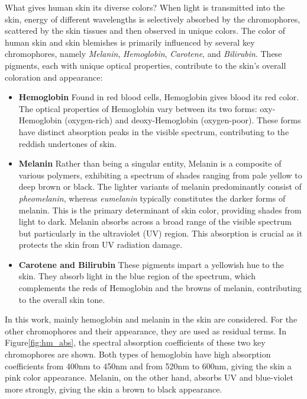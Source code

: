 \begin{spacing}{1.5}
What gives human skin its diverse colors? When light is transmitted into the skin, energy of different wavelengths is selectively absorbed by the chromophores, scattered by the skin tissues and then observed in unique colors. The color of human skin and skin blemishes is primarily influenced by several key chromophores, namely \textit{Melanin}, \textit{Hemoglobin}, \textit{Carotene}, and \textit{Bilirubin}. These pigments, each with unique optical properties, contribute to the skin's overall coloration and appearance:

\begin{itemize}
    \item \textbf{Hemoglobin} Found in red blood cells, Hemoglobin gives blood its red color. The optical properties of Hemoglobin vary between its two forms: oxy-Hemoglobin (oxygen-rich) and deoxy-Hemoglobin (oxygen-poor). These forms have distinct absorption peaks in the visible spectrum, contributing to the reddish undertones of skin.
    \item \textbf{Melanin} Rather than being a singular entity, Melanin is a composite of various polymers, exhibiting a spectrum of shades ranging from pale yellow to deep brown or black. The lighter variants of melanin predominantly consist of \textit{pheomelanin}, whereas \textit{eumelanin} typically constitutes the darker forms of melanin\cite{alalufEthnicVariationMelanin2002a}. This is the primary determinant of skin color\cite{doiSpectralEstimationHuman2003}, providing shades from light to dark. Melanin absorbs across a broad range of the visible spectrum but particularly in the ultraviolet (UV) region\cite{ANDERSON198113}. This absorption is crucial as it protects the skin from UV radiation damage. 
    \item \textbf{Carotene and Bilirubin} These pigments impart a yellowish hue to the skin. They absorb light in the blue region of the spectrum, which complements the reds of Hemoglobin and the browns of melanin, contributing to the overall skin tone\cite{ANDERSON198113}.
\end{itemize}


In this work, mainly hemoglobin and melanin in the skin are considered. For the other chromophores and their appearance, they are used as residual terms. In Figure\ref{fig:hm_abs}, the spectral absorption coefficients of these two key chromophores are shown. Both types of hemoglobin have high absorption coefficients from 400nm to 450nm and from 520nm to 600nm, giving the skin a pink color appearance. Melanin, on the other hand, absorbs UV and blue-violet more strongly, giving the skin a brown to black appearance.


\end{spacing}
